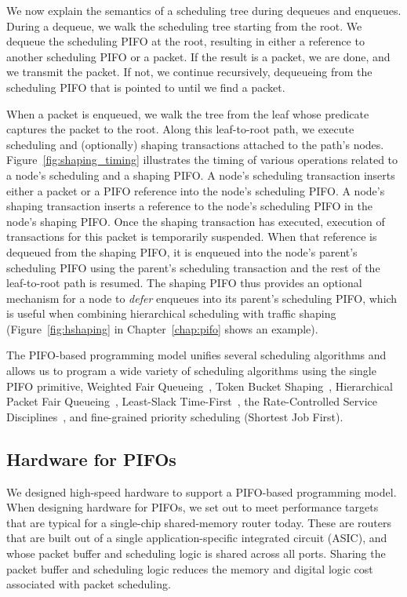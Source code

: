We now explain the semantics of a scheduling tree during dequeues and enqueues.
During a dequeue, we walk the scheduling tree starting from the root. We
dequeue the scheduling PIFO at the root, resulting in either a reference to
another scheduling PIFO or a packet. If the result is a packet, we are done,
and we transmit the packet. If not, we continue recursively, dequeueing from
the scheduling PIFO that is pointed to until we find a packet.

When a packet is enqueued, we walk the tree from the leaf whose predicate
captures the packet to the root. Along this leaf-to-root path, we execute
scheduling and (optionally) shaping transactions attached to the path's nodes.
Figure~\ref{fig:shaping_timing} illustrates the timing of various operations
related to a node's scheduling and a shaping PIFO. A node's scheduling
transaction inserts either a packet or a PIFO reference into the node's
scheduling PIFO. A node's shaping transaction inserts a reference to the node's
scheduling PIFO in the node's shaping PIFO. Once the shaping transaction has
executed, execution of transactions for this packet is temporarily suspended.
When that reference is dequeued from the shaping PIFO, it is enqueued into the
node's parent's scheduling PIFO using the parent's scheduling transaction and
the rest of the leaf-to-root path is resumed.  The shaping PIFO thus provides
an optional mechanism for a node to {\em defer} enqueues into its parent's
scheduling PIFO, which is useful when combining hierarchical scheduling with
traffic shaping (Figure~\ref{fig:hshaping} in Chapter~\ref{chap:pifo} shows an
example).

The PIFO-based programming model unifies several scheduling algorithms and
allows us to program a wide variety of scheduling algorithms using the single
PIFO primitive, \eg Weighted Fair Queueing~\cite{wfq}, Token Bucket
Shaping~\cite{tbf}, Hierarchical Packet Fair Queueing~\cite{hpfq}, Least-Slack
Time-First~\cite{lstf}, the Rate-Controlled Service Disciplines~\cite{rcsd},
and fine-grained priority scheduling (\eg Shortest Job First).

\subsection{Hardware for PIFOs}
\label{ss:intro_pifo_hardware}

We designed high-speed hardware to support a
PIFO-based programming model. When designing hardware for PIFOs, we set out to
meet performance targets that are typical for a single-chip shared-memory
router today. These are routers that are built out of a single
application-specific integrated circuit (ASIC), and whose packet buffer and
scheduling logic is shared across all ports. Sharing the packet buffer and
scheduling logic reduces the memory and digital logic cost associated with
packet scheduling.

